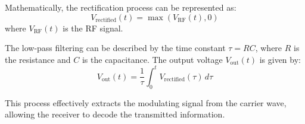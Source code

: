 Mathematically, the rectification process can be represented as:
\[ V_{\text{rectified}}(t) = \max(V_{\text{RF}}(t), 0) \]
where \( V_{\text{RF}}(t) \) is the RF signal.

The low-pass filtering can be described by the time constant \( \tau = RC \), where \( R \) is the resistance and \( C \) is the capacitance. The output voltage \( V_{\text{out}}(t) \) is given by:
\[ V_{\text{out}}(t) = \frac{1}{\tau} \int_{0}^{t} V_{\text{rectified}}(\tau) \, d\tau \]

This process effectively extracts the modulating signal from the carrier wave, allowing the receiver to decode the transmitted information.

